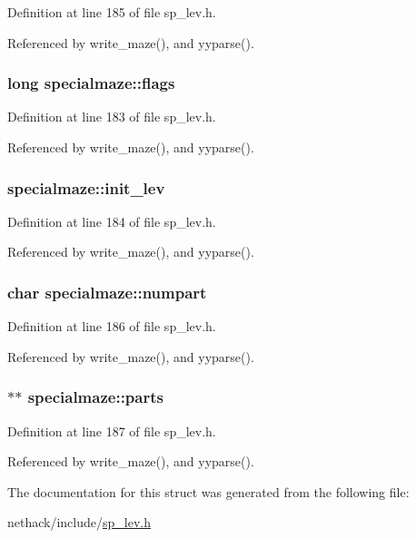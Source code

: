 Definition at line 185 of file sp\+\_\+lev.\+h.



Referenced by write\+\_\+maze(), and yyparse().

\hypertarget{structspecialmaze_a787acf0a4703a5f4eba92135c1776409}{
\subsubsection[{flags}]{\setlength{\rightskip}{0pt plus 5cm}long specialmaze\+::flags}}\label{structspecialmaze_a787acf0a4703a5f4eba92135c1776409}


Definition at line 183 of file sp\+\_\+lev.\+h.



Referenced by write\+\_\+maze(), and yyparse().

\hypertarget{structspecialmaze_af54101363dfb2b1e3df12c943c23dbf4}{
\subsubsection[{init\+\_\+lev}]{ specialmaze\+::init\+\_\+lev}}\label{structspecialmaze_af54101363dfb2b1e3df12c943c23dbf4}


Definition at line 184 of file sp\+\_\+lev.\+h.



Referenced by write\+\_\+maze(), and yyparse().

\hypertarget{structspecialmaze_ad827b69cc4db02d75e0336da1aa8ea0e}{
\subsubsection[{numpart}]{\setlength{\rightskip}{0pt plus 5cm}char specialmaze\+::numpart}}\label{structspecialmaze_ad827b69cc4db02d75e0336da1aa8ea0e}


Definition at line 186 of file sp\+\_\+lev.\+h.



Referenced by write\+\_\+maze(), and yyparse().

\hypertarget{structspecialmaze_a28db847d2018fa5841c388b1be2da4e5}{
\subsubsection[{parts}]{$\ast$$\ast$ specialmaze\+::parts}}\label{structspecialmaze_a28db847d2018fa5841c388b1be2da4e5}


Definition at line 187 of file sp\+\_\+lev.\+h.



Referenced by write\+\_\+maze(), and yyparse().



The documentation for this struct was generated from the following file\+:\begin{DoxyCompactItemize}
\item 
nethack/include/\hyperlink{sp__lev_8h}{sp\+\_\+lev.\+h}\end{DoxyCompactItemize}

